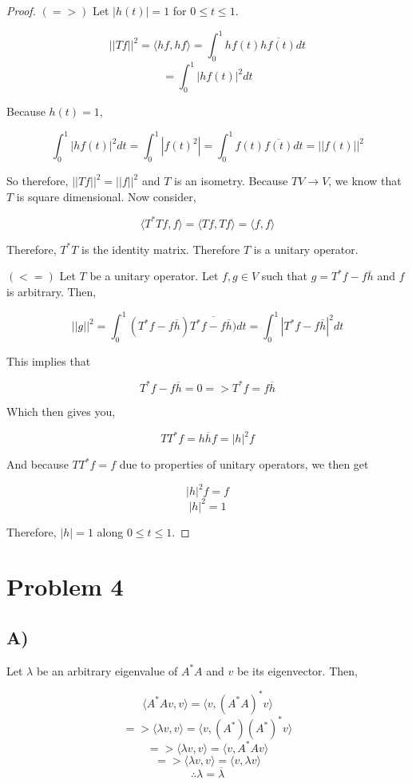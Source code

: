 \documentclass[12pt, letterpaper]{article}
\begin{document}
\begin{proof}

$(=>)$ Let $|h(t)| = 1$ for $0 \le t \le 1$.

\[ ||Tf||^2 = \langle hf, hf \rangle = \int^1_0 hf(t) \overline{hf(t)} dt \]
\[ = \int^1_0 |hf(t)|^2 dt \]

Because $h(t) = 1 $, 

\[ \int^1_0 |hf(t)|^2 dt = \int^1_0 |f(t)^2| = \int^1_0 f(t) \overline{f(t)} dt = ||f(t)||^2 \]

So therefore, $||Tf||^2 = ||f||^2$ and $T$ is an isometry. Because $T V \rightarrow V$, we know that $T$ is square dimensional. Now consider,

\[ \langle T^*Tf, f \rangle = \langle Tf, Tf \rangle = \langle f, f \rangle \]

Therefore, $T^*T$ is the identity matrix. Therefore $T$ is a unitary operator. 

\vspace{\baselineskip}

$(<=)$ Let $T$ be a unitary operator. Let $f, g \in V$ such that $g = T^*f - f \overline{h}$ and $f$ is arbitrary. Then,

\[ ||g||^2 = \int^1_0 (T^*f - f \overline{h}) \overline{T^*f - f \overline{h})} dt = \int^1_0 |T^*f - f \overline{h}|^2 dt \]

This implies that

\[ T^*f - f \overline{h} = 0 => T^*f = f \overline{h} \]

Which then gives you,

\[ TT^*f = h \overline{h}f = |h|^2f \]

And because $TT^*f = f$ due to properties of unitary operators, we then get

\[ |h|^2f = f \]
\[ |h|^2 = 1 \]

Therefore, $|h| = 1$ along $0 \le t \le 1$. 

\end{proof}

\section*{Problem 4}

\subsection*{A)}
Let $\lambda$ be an arbitrary eigenvalue of $A^*A$ and $v$ be its eigenvector. Then,

\[ \langle A^*Av, v \rangle = \langle v, (A^*A)^*v \rangle \]
\[ => \langle \lambda v, v \rangle = \langle v, (A^*)(A^*)^*v \rangle \]
\[ => \langle \lambda v, v \rangle = \langle v, A^*Av \rangle \]
\[ => \langle \lambda v, v \rangle = \langle v, \lambda v \rangle \]
\[ \therefore \lambda = \overline{\lambda} \]
\end{document}
